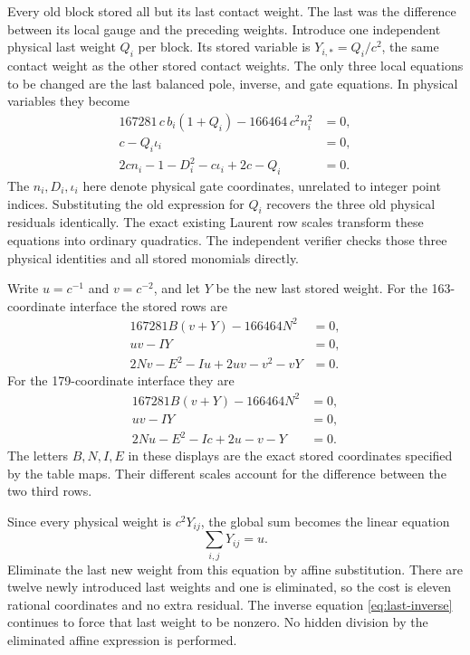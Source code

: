 \documentclass[11pt]{article}
\begin{document}
Every old block stored all but its last contact weight. The last was
the difference between its local gauge and the preceding weights.
Introduce one independent physical last weight \(Q_i\) per block.
Its stored variable is \(Y_{i,*}=Q_i/c^2\), the same contact weight
as the other stored contact weights. The only three local equations
to be changed are the last balanced pole, inverse, and gate equations.
In physical variables they become
\begin{align}
 167281\,c\,b_i(1+Q_i)-166464\,c^2n_i^2&=0,\label{eq:last-pole}\\
 c-Q_i\iota_i&=0,\label{eq:last-inverse}\\
 2cn_i-1-D_i^2-c\iota_i+2c-Q_i&=0.\label{eq:last-gate}
\end{align}
The \(n_i,D_i,\iota_i\) here denote physical gate coordinates,
unrelated to integer point indices. Substituting the old expression
for \(Q_i\) recovers the three old physical residuals identically.
The exact existing Laurent row scales transform these equations into
ordinary quadratics. The independent verifier checks those three
physical identities and all stored monomials directly.

Write \(u=c^{-1}\) and \(v=c^{-2}\), and let \(Y\) be the new
last stored weight. For the 163-coordinate interface the stored rows
are
\begin{align*}
 167281 B(v+Y)-166464 N^2&=0,\\
 uv-IY&=0,\\
 2Nv-E^2-Iu+2uv-v^2-vY&=0.
\end{align*}
For the 179-coordinate interface they are
\begin{align*}
 167281 B(v+Y)-166464 N^2&=0,\\
 uv-IY&=0,\\
 2Nu-E^2-Ic+2u-v-Y&=0.
\end{align*}
The letters \(B,N,I,E\) in these displays are the exact stored
coordinates specified by the table maps. Their different scales
account for the difference between the two third rows.

Since every physical weight is \(c^2Y_{ij}\), the global sum becomes
the linear equation
\begin{equation}\label{eq:linear-weight-sum}
                         \sum_{i,j}Y_{ij}=u.
\end{equation}
Eliminate the last new weight from this equation by affine
substitution. There are twelve newly introduced last weights and one
is eliminated, so the cost is eleven rational coordinates and no
extra residual. The inverse equation \eqref{eq:last-inverse}
continues to force that last weight to be nonzero. No hidden
division by the eliminated affine expression is performed.
\end{document}
